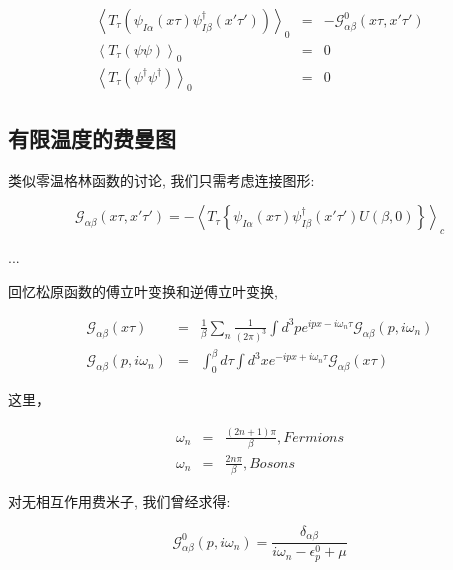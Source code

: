 \begin{eqnarray*}
  \left\langle T_\tau (\psi_{I\alpha}(x\tau) \psi_{I\beta}^\dagger (x'\tau')) \right\rangle_0 &=& - \mathcal{ G }_{\alpha \beta}^0 (x\tau, x'\tau') \\
  \left\langle T_\tau (\psi \psi) \right\rangle_0 &=& 0 \\
  \left\langle T_\tau (\psi^\dagger \psi^\dagger) \right\rangle_0 &=&
  0
\end{eqnarray*}


\subsection{有限温度的费曼图}

类似零温格林函数的讨论, 我们只需考虑连接图形:

\begin{equation*}
\mathcal{G}_{\alpha \beta}(x\tau,x'\tau') = - \left\langle T_\tau
\left\{ \psi_{I\alpha}(x\tau)\psi_{I\beta}^\dagger(x'\tau')
U(\beta,0) \right\} \right\rangle_c
\end{equation*}

...

回忆松原函数的傅立叶变换和逆傅立叶变换,

\begin{eqnarray*}
  \mathcal{G}_{\alpha \beta}(x\tau) &=& \frac{1}{\beta} \sum_n \frac{1}{(2\pi)^3}\int d^3 p e^{ipx-i\omega_n \tau} \mathcal{G}_{\alpha \beta}(p,i\omega_n) \\
  \mathcal{G}_{\alpha \beta} (p,i\omega_n) &=& \int_0^\beta d \tau \int d^3 x  e^{-ipx + i \omega_n \tau} \mathcal{G}_{\alpha \beta} (x\tau)
\end{eqnarray*}

这里，

\begin{eqnarray*}
  \omega_n &=& \frac{(2n+1)\pi}{\beta}, Fermions \\
  \omega_n &=& \frac{2n\pi}{\beta}, Bosons
\end{eqnarray*}

对无相互作用费米子, 我们曾经求得:

\begin{equation*}
\mathcal{G}_{\alpha \beta}^0 (p, i\omega_n) = \frac{\delta_{\alpha
\beta }}{i \omega_n - \epsilon_p^0 + \mu}
\end{equation*}

